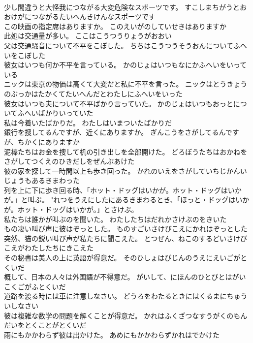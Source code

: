 \documentclass[8pt]{extreport}
\begin{document}
\begin{CJK}{UTF8}{min}
\\	少し間違うと大怪我につながる大変危険なスポーツです。	すこしまちがうとおおけがにつながるたいへんきけんなスポーツです 
\\	この映画の指定席はありますか。	このえいがのしていせきはありますか 
\\	此処は交通量が多い。	ここはこうつうりょうがおおい 
\\	父は交通騒音について不平をこぼした。	ちちはこうつうそうおんについてふへいをこぼした 
\\	彼女はいつも何か不平を言っている。	かのじょはいつもなにかふへいをいっている 
\\	ニックは東京の物価は高くて大変だと私に不平を言った。	ニックはとうきょうのぶっかはたかくてたいへんだとわたしにふへいをいった 
\\	彼女はいつも夫について不平ばかり言っていた。	かのじょはいつもおっとについてふへいばかりいっていた 
\\	私は今着いたばかりだ。	わたしはいまついたばかりだ 
\\	銀行を捜してるんですが、近くにありますか。	ぎんこうをさがしてるんですが、ちかくにありますか 
\\	泥棒たちはお金を捜して机の引き出しを全部開けた。	どろぼうたちはおかねをさがしてつくえのひきだしをぜんぶあけた 
\\	彼の家を探して一時間以上も歩き回った。	かれのいえをさがしていちじかんいじょうもあるきまわった 
\\	列を上に下に歩き回る時、「ホット・ドッグはいかが。ホット・ドッグはいかが。」と叫ぶ。	"れつをうえにしたにあるきまわるとき、「ほっと・ドッグはいかが。ホット・ドッグはいかが。」とさけぶ。 
\\	私たちは誰かが叫ぶのを聞いた。	わたしたちはだれかさけぶのをきいた 
\\	もの凄い叫び声に彼はぞっとした。	ものすごいさけびこえにかれはぞっとした 
\\	突然、猫の鋭い叫び声が私たちに聞こえた。	とつぜん、ねこのするどいさけびこえがわたしたちにきこえた 
\\	その秘書は美人の上に英語が得意だ。	そのひしょはびじんのうえにえいごがとくいだ 
\\	概して、日本の人々は外国語が不得意だ。	がいして、にほんのひとびとはがいこくごがふとくいだ 
\\	道路を渡る時には車に注意しなさい。	どうろをわたるときにはくるまにちゅういしなさい 
\\	彼は複雑な数学の問題を解くことが得意だ。	かれはふくざつなすうがくのもんだいをとくことがとくいだ 
\\	雨にもかかわらず彼は出かけた。	あめにもかかわらずかれはでかけた 

\end{CJK}
\end{document}
